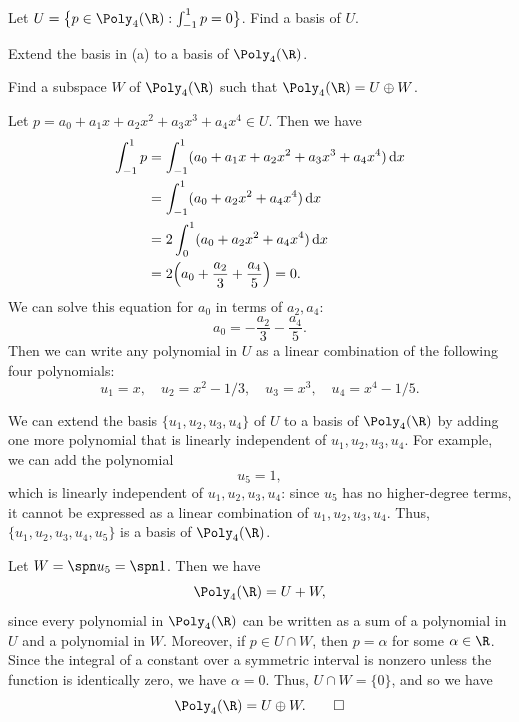 \begin{exercise}\leavevmode
\begin{parts}
\item Let $U=\bigl\{p\in\Poly_4(\R) : \int_{-1}^1p=0\bigr\}$. Find a basis
  of $U$.
\item Extend the basis in (a) to a basis of $\Poly_4(\R)$.
\item Find a subspace $W$ of $\Poly_4(\R)$ such that $\Poly_4(\R)=U\oplus W$.
\end{parts}
\end{exercise}
\begin{solution}
\begin{parts}
\item Let $p=a_0+a_1x+a_2x^2+a_3x^3+a_4x^4\in U$. Then we have
  \begin{align*}
  \int_{-1}^1p &= \int_{-1}^1(a_0+a_1x+a_2x^2+a_3x^3+a_4x^4)\,\mathrm{d}x\\
    &= \int_{-1}^1(a_0+a_2x^2+a_4x^4)\,\mathrm{d}x\\
    &= 2\int_0^1(a_0+a_2x^2+a_4x^4)\,\mathrm{d}x\\
    &= 2\Bigl(a_0+\frac{a_2}{3}+\frac{a_4}{5}\Bigr) = 0.
  \end{align*}
  We can solve this equation for $a_0$ in terms of $a_2,a_4$:
  \[ a_0 = -\frac{a_2}{3}-\frac{a_4}{5}. \]
  Then we can write any polynomial in $U$ as a linear combination of the
  following four polynomials:
  \[ u_1=x, \quad u_2=x^2-1/3, \quad u_3=x^3, \quad u_4=x^4-1/5. \]
\item We can extend the basis $\{u_1,u_2,u_3,u_4\}$ of $U$ to a basis of
  $\Poly_4(\R)$ by adding one more polynomial that is linearly independent of
  $u_1,u_2,u_3,u_4$. For example, we can add the polynomial
  \[ u_5 = 1, \]
  which is linearly independent of $u_1,u_2,u_3,u_4$: since $u_5$ has no
  higher-degree terms, it cannot be expressed as a linear combination of
  $u_1,u_2,u_3,u_4$. Thus, $\{u_1,u_2,u_3,u_4,u_5\}$ is a basis of
  $\Poly_4(\R)$.
\item Let $W=\spn u_5=\spn 1$. Then we have
  \[ \Poly_4(\R) = U+W, \]
  since every polynomial in $\Poly_4(\R)$ can be written as a sum of a
  polynomial in $U$ and a polynomial in $W$. Moreover, if $p\in U\cap W$, then
  $p=\alpha$ for some $\alpha\in\R$. Since the integral of a constant over a
  symmetric interval is nonzero unless the function is identically zero, we
  have $\alpha=0$. Thus, $U\cap W=\{0\}$, and so we have
  \[ \Poly_4(\R) = U\oplus W. \qedhere \]
\end{parts}
\end{solution}

